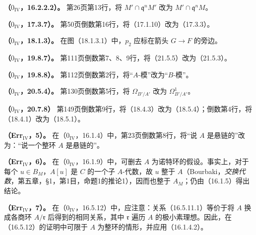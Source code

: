 
\hypertarget{ErrIV:A16222}{}\noindent\textbf{（$0_{\mathrm{IV}}$，16.2.2.2）。}
第26页第13行，将 $M'\cap\mathfrak q^nM'$ 改为 $M'\cap\mathfrak q^nM$。

\medskip
\hypertarget{ErrIV:A1737}{}\noindent\textbf{（$0_{\mathrm{IV}}$，17.3.7）。}
第50页倒数第16行，将（17.1.10）改为（17.3.3）。

\medskip
\hypertarget{ErrIV:A1813}{}\noindent\textbf{（$0_{\mathrm{IV}}$，18.1.3）。}
在图（18.1.3.1）中，$p_2$ 应标在箭头 $G\to F$ 的旁边。

\medskip
\hypertarget{ErrIV:A1987}{}\noindent\textbf{（$0_{\mathrm{IV}}$，19.8.7）。}
第111页倒数第7、8、9行，将（21.5.5）改为（21.5.3）。

\medskip
\hypertarget{ErrIV:A1988}{}\noindent\textbf{（$0_{\mathrm{IV}}$，19.8.8）。}
第112页倒数第2行，将“$A$-模”改为“$B$-模”。

\medskip
\hypertarget{ErrIV:A2054}{}\noindent\textbf{（$0_{\mathrm{IV}}$，20.5.4）。}
第130页倒数第5行，将 $\Omega_{B'/A'}$ 改为 $\Omega^1_{B'/A'}$。


\par\medskip
\hypertarget{ErrIV:A2078}{}\textbf{（$0_{\mathrm{IV}}$，20.7.8）}
第149页倒数第9行，将（18.4.3）改为（18.5.4）；倒数第4行，将（18.4.1）改为（18.5.1）。

\hypertarget{ErrIV:5}{}
\noindent\textbf{（Err$_{\mathrm{IV}}$，5）。}
在（$0_{\mathrm{IV}}$，16.1.4）中，第23页倒数第8行，将“说 $A$ 是悬链的”改为：“说一个整环 $A$ 是悬链的”。

\medskip
\hypertarget{ErrIV:6}{}
\noindent\textbf{（Err$_{\mathrm{IV}}$，6）。}
在（$0_{\mathrm{IV}}$，16.1.9）中，可删去 $A$ 为诺特环的假设。事实上，对于每个 $u\in B_M$，$A[u]$ 是 $C$ 的一个子 $A$-代数，故 $u$ 整于 $A$（Bourbaki，\textit{交换代数}，第五章，§1，第1目，命题1的推论1），因而也整于 $A_M$；仍由（16.1.5）得出结论。

\medskip
\hypertarget{ErrIV:7}{}
\noindent\textbf{（Err$_{\mathrm{IV}}$，7）。}
在（$0_{\mathrm{IV}}$，16.5.12）中，应注意：关系（16.5.11.1）等价于将 $A$ 换成各商环 $A/\mathfrak r$ 后得到的相同关系，其中 $\mathfrak r$ 遍历 $A$ 的极小素理想。因此，在（16.5.12）的证明中可限于 $A$ 为整环的情形，并应用（16.1.4.2）。


